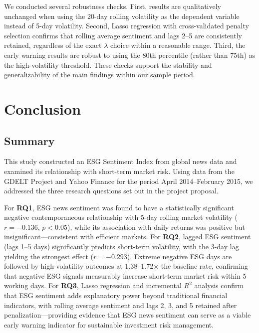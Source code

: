 \documentclass[12pt,a4paper]{article}
\begin{document}
We conducted several robustness checks. First, results are qualitatively unchanged when using the 20-day rolling volatility as the dependent variable instead of 5-day volatility. Second, Lasso regression with cross-validated penalty selection confirms that rolling average sentiment and lags 2--5 are consistently retained, regardless of the exact $\lambda$ choice within a reasonable range. Third, the early warning results are robust to using the 80th percentile (rather than 75th) as the high-volatility threshold. These checks support the stability and generalizability of the main findings within our sample period.


\section{Conclusion}
\label{sec:conclusion}

\subsection{Summary}
\label{subsec:conclusion-summary}

This study constructed an ESG Sentiment Index from global news data and examined its relationship with short-term market risk. Using data from the GDELT Project and Yahoo Finance for the period April 2014--February 2015, we addressed the three research questions set out in the project proposal.

For \textbf{RQ1}, ESG news sentiment was found to have a statistically significant negative contemporaneous relationship with 5-day rolling market volatility ($r = -0.136$, $p < 0.05$), while its association with daily returns was positive but insignificant---consistent with efficient markets. For \textbf{RQ2}, lagged ESG sentiment (lags 1--5 days) significantly predicts short-term volatility, with the 3-day lag yielding the strongest effect ($r = -0.293$). Extreme negative ESG days are followed by high-volatility outcomes at 1.38--1.72$\times$ the baseline rate, confirming that negative ESG signals measurably increase short-term market risk within 5 working days. For \textbf{RQ3}, Lasso regression and incremental $R^2$ analysis confirm that ESG sentiment adds explanatory power beyond traditional financial indicators, with rolling average sentiment and lags 2, 3, and 5 retained after penalization---providing evidence that ESG news sentiment can serve as a viable early warning indicator for sustainable investment risk management.
\end{document}
